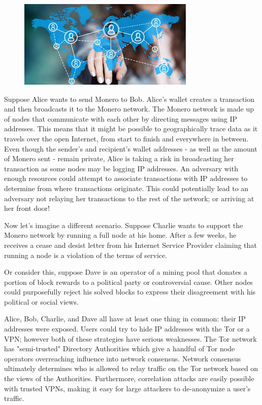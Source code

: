 \begin{figure}
\centering
\includegraphics[height=0.15\textwidth]{Images/Kovri/trace.jpg}
\end{figure}
Suppose Alice wants to send Monero to Bob. Alice's wallet creates a transaction and then broadcasts it to the Monero network. The Monero network is made up of nodes that communicate with each other by directing messages using IP addresses. This means that it might be possible to geographically trace data as it travels over the open Internet, from start to finish and everywhere in between. Even though the sender's and recipient's wallet addresses - as well as the amount of Monero sent - remain private, Alice is taking a risk in broadcasting her transaction as some nodes may be logging IP addresses. An adversary with enough resources could attempt to associate transactions with IP addresses to determine from where transactions originate. This could potentially lead to an adversary not relaying her transactions to the rest of the network; or arriving at her front door!

Now let’s imagine a different scenario. Suppose Charlie wants to support the Monero network by running a full node at his home. After a few weeks, he receives a cease and desist letter from his Internet Service Provider claiming that running a node is a violation of the terms of service.

Or consider this, suppose Dave is an operator of a mining pool that donates a portion of block rewards to a political party or controversial cause. Other nodes could purposefully reject his solved blocks to express their disagreement with his political or social views.

Alice, Bob, Charlie, and Dave all have at least one thing in common: their IP addresses were exposed. Users could try to hide IP addresses with the Tor or a VPN; however both of these strategies have serious weaknesses. The Tor network has "semi-trusted" Directory Authorities which give a handful of Tor node operators overreaching influence into network consensus. Network consensus ultimately determines who is allowed to relay traffic on the Tor network based on the views of the Authorities. Furthermore, correlation attacks are easily possible with trusted VPNs, making it easy for large attackers to de-anonymize a user's traffic.

